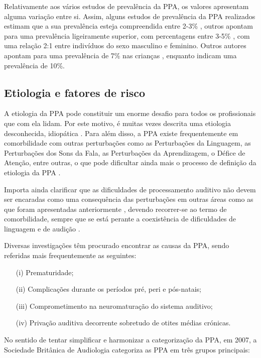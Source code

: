\documentclass[output=paper,colorlinks,citecolor=brown,booklanguage=portuguese]{langscibook}
\begin{document}
Relativamente aos vários estudos de prevalência da PPA, os valores apresentam alguma variação entre si. Assim, alguns estudos de prevalência da PPA realizados estimam que a sua prevalência esteja compreendida entre 2-3\% \citep{Chermak1997}, outros apontam para uma prevalência ligeiramente superior, com percentagens entre 3-5\% \citep{OBeirne2012}, com uma relação 2:1 entre indivíduos do sexo masculino e feminino. Outros autores apontam para uma prevalência de 7\% nas crianças \citep{Bamiou2001}, enquanto \citet{Saunders1992} indicam uma prevalência de 10\%.

\subsection{Etiologia e fatores de risco}
A etiologia da PPA pode constituir um enorme desafio para todos os profissionais que com ela lidam. Por este motivo, é muitas vezes descrita uma etiologia desconhecida, idiopática \citep{Bellis2015}.  Para além disso, a PPA existe frequentemente em comorbilidade com outras perturbações como as Perturbações da Linguagem, as Perturbações dos Sons da Fala, as Perturbações da Aprendizagem, o Défice de Atenção, entre outras, o que pode dificultar ainda mais o processo de definição da etiologia da PPA \citep{ASHA2005, BSA2018, Yathiraj2018, Zalcman2007}. 

Importa ainda clarificar que as dificuldades de processamento auditivo não devem ser encaradas como uma consequência das perturbações em outras áreas como as que foram apresentadas anteriormente \citep{ASHA2005, BSA2011, Nunes2015}, devendo recorrer-se ao termo de comorbilidade, sempre que se está perante a coexistência de dificuldades de linguagem e de audição \citep{Jerger2000}.

Diversas investigações têm procurado encontrar as causas da PPA, sendo referidas mais frequentemente as seguintes:

\begin{enumerate}
    \item [(i)] Prematuridade; 
\item[(ii)] Complicações durante os períodos pré, peri e pós-natais; 
\item[(iii)] Comprometimento na neuromaturação do sistema auditivo; 
\item[(iv)] Privação auditiva decorrente sobretudo de otites médias crónicas.
\end{enumerate}
No sentido de tentar simplificar e harmonizar a categorização da PPA, em 2007, a Sociedade Britânica de Audiologia categoriza as PPA em três grupos principais: 
\end{document}
